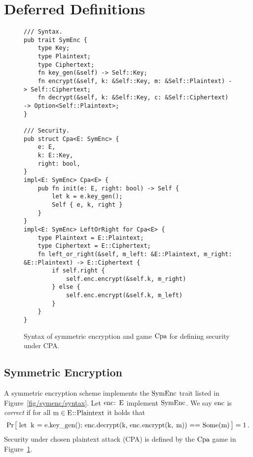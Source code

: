 \documentclass{article}
\newcommand{\Prob}[1]{\Pr\hspace{-1pt}\big[\,#1\,\big]}
\newcommand{\code}[1]{\textrm{\textup{\lstinline{#1}}}}
\begin{document}



\appendix


\section{Deferred Definitions}

\begin{figure}[t]
\begin{lstlisting}
/// Syntax.
pub trait SymEnc {
    type Key;
    type Plaintext;
    type Ciphertext;
    fn key_gen(&self) -> Self::Key;
    fn encrypt(&self, k: &Self::Key, m: &Self::Plaintext) -> Self::Ciphertext;
    fn decrypt(&self, k: &Self::Key, c: &Self::Ciphertext) -> Option<Self::Plaintext>;
}

/// Security.
pub struct Cpa<E: SymEnc> {
    e: E,
    k: E::Key,
    right: bool,
}
impl<E: SymEnc> Cpa<E> {
    pub fn init(e: E, right: bool) -> Self {
        let k = e.key_gen();
        Self { e, k, right }
    }
}
impl<E: SymEnc> LeftOrRight for Cpa<E> {
    type Plaintext = E::Plaintext;
    type Ciphertext = E::Ciphertext;
    fn left_or_right(&self, m_left: &E::Plaintext, m_right: &E::Plaintext) -> E::Ciphertext {
        if self.right {
            self.enc.encrypt(&self.k, m_right)
        } else {
            self.enc.encrypt(&self.k, m_left)
        }
    }
}
\end{lstlisting}
  \caption{Syntax of symmetric encryption and game $\code{Cpa}$ for defining
  security under CPA.}
  \label{fig/symenc/syntax}
  \label{fig/symenc/security}
\end{figure}





\subsection{Symmetric Encryption}
\label{sec/symenc}

A symmetric encryption scheme implements the $\code{SymEnc}$ trait listed in
Figure~\ref{fig/symenc/syntax}.
%
Let $\code{enc: E}$ implement $\code{SymEnc}$.
%
We say $\code{enc}$ is \emph{correct} if for all $\code{m} \in
\code{E::Plaintext}$ it holds that
%
\[
  \Prob{
    \code{let k = e.key_gen();
    enc.decrypt(k, enc.encrypt(k, m)) == Some(m)}
  } = 1 \,.
\]
%
Security under chosen plaintext attack (CPA) is defined by the $\code{Cpa}$
game in Figure~\ref{fig/symenc/security}.
\end{document}
